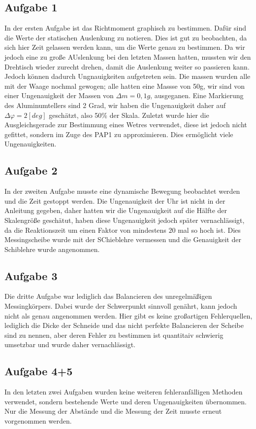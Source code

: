 \subsection*{Aufgabe 1}
In der ersten Aufgabe ist das Richtmoment graphisch zu bestimmen. Dafür sind die Werte der statischen Auslenkung zu notieren. Dies ist gut zu beobachten, da sich hier 
Zeit gelassen werden kann, um die Werte genau zu bestimmen. Da wir jedoch eine zu große AUslenkung bei den letzten Massen hatten, mussten wir 
den Drehtisch wieder zurecht drehen, damit die Auslenkung weiter so passieren kann. Jedoch können dadurch Ungnauigkeiten aufgetreten sein. 
Die massen wurden alle mit der Waage nochmal gewogen; alle hatten eine Massse von 50g, wir sind von einer Ungenauigkeit der Massen von $\Delta m = 0,1g$, ausgeganen.
Eine Markierung des Aluminumtellers sind 2 Grad, wir haben die Ungenauigkeit daher auf $\Delta \varphi = 2 [deg]$ geschätzt, also 50\% der Skala. 
Zuletzt wurde hier die Ausgleichsgerade zur Bestimmung eines Wetres verwendet, diese ist jedoch nicht gefittet, sondern im Zuge des PAP1 zu approximieren. Dies ermöglicht viele Ungenauigkeiten.

\subsection*{Aufgabe 2}
In der zweiten Aufgabe musste eine dynamische Bewegung beobachtet werden und die Zeit gestoppt werden. Die Ungenauigkeit der Uhr ist nicht in der Anleitung gegeben, daher hatten
wir die Ungenauigkeit auf die Hälfte der Skalengröße geschätut, haben diese Ungenauigkeit jedoch später vernachlässigt, da die Reaktionszeit um einen Faktor von mindestens $20$ mal so hoch ist.
Dies Messingscheibe wurde mit der SChieblehre vermessen und die Genauigkeit der Schiblehre wurde angenommen. 

\subsection*{Aufgabe 3}
Die dritte Aufgabe war lediglich das Balancieren des unregelmäßigen Messingkörpers. Dabei wurde der Schwerpunkt sinnvoll genährt, kann jedoch nicht als genau angenommen werden.
Hier gibt es keine großartigen Fehlerquellen, lediglich die Dicke der Schneide und das nicht perfekte Balancieren der Scheibe sind zu nennen, aber deren Fehler zu bestimmen 
ist quantitaiv schwierig umsetzbar und wurde daher vernachlässigt.

\subsection*{Aufgabe 4+5}
In den letzten zwei Aufgaben wurden keine weiteren fehleranfälligen Methoden verwendet, sondern bestehende Werte und deren Ungenauigkeiten übernommen.
Nur die Messung der Abstände und die Messung der Zeit musste erneut vorgenommen werden. 